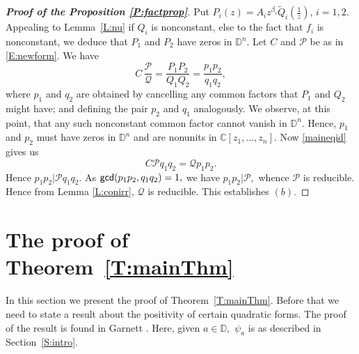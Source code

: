 \documentclass[11pt, reqno]{amsart}
\numberwithin{equation}{section}
\theoremstyle{definition}
\theoremstyle{remark}
\theoremstyle{plain}
\begin{document}
\begin{proof}[{\bf Proof of the Proposition \ref{P:factprop}}]
Put $P_i(z)= A_i z^{\beta_i}\widetilde{Q}_i(\frac{1}{z})$, $i = 1,2.$
Appealing to Lemma~\ref{L:nu} if $Q_i$ is nonconstant, else to the fact that $f_i$ is nonconstant,
we deduce that $P_1$ and $P_2$ have zeros in ${\mathbb{D}}^n$. 
Let $C$ and $\mathcal{P}$ be as in \eqref{E:newform}. We have
\begin{equation}
C\,\frac{\mathcal{P}}{\mathcal{Q}}=\frac{P_1P_2}{Q_1Q_2}=\frac{p_1p_2}{q_1q_2}, \label{maineqid}
\end{equation}
where $p_1$ and $q_2$ are obtained by cancelling any common factors that $P_1$ and $Q_2$ might
have; and defining the pair $p_2$ and $q_1$ analogously.  
We observe, at this point, that any such nonconstant common factor cannot vanish in ${\mathbb{D}}^n.$ Hence,
$p_1$ and $p_2$ must have zeros in ${\mathbb{D}}^n$ and are nonunits in ${\mathbb{C}}[z_1,\ldots,z_n].$  
Now \eqref{maineqid} gives us
\begin{equation*}
C\mathcal{P}q_1q_2 = {\mathcal{Q}} p_1p_2.
\end{equation*}
Hence $p_1p_2|\mathcal{P}q_1q_2.$ As ${{\sf gcd}}(p_1p_2, q_1q_2)=1,$ we have $p_1p_2|\mathcal{P},$
whence $\mathcal{P}$ is reducible. Hence from Lemma \ref{L:conirr}, ${\mathcal{Q}}$ is reducible. This establishes $(b)$.
\end{proof}
\medskip

\section{The proof of Theorem~\ref{T:mainThm}}\label{S:Thm}

In this section we present the proof of Theorem~\ref{T:mainThm}. Before that we
need to state a result about the positivity of certain quadratic forms. The proof of the
result is found in Garnett \cite[Theorem~2.2]{garnett:ftp07}. Here, given $a\in{\mathbb{D}},$ $\psi_a$
is as described in Section~\ref{S:intro}.
\end{document}
